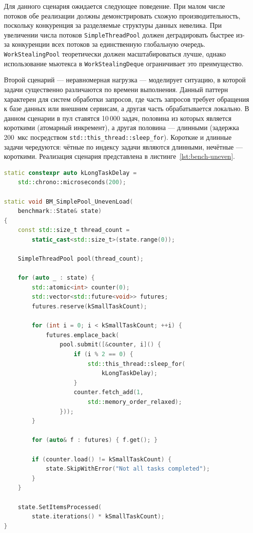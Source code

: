 Для данного сценария ожидается следующее поведение. При малом
числе потоков обе реализации должны демонстрировать схожую
производительность, поскольку конкуренция за разделяемые
структуры данных невелика. При увеличении числа потоков
\texttt{SimpleThreadPool} должен деградировать быстрее из-за
конкуренции всех потоков за единственную глобальную очередь.
\texttt{WorkStealingPool} теоретически должен масштабироваться
лучше, однако использование мьютекса в \texttt{WorkStealingDeque}
ограничивает это преимущество.

Второй сценарий --- неравномерная нагрузка --- моделирует
ситуацию, в которой задачи существенно различаются по времени
выполнения. Данный паттерн характерен для систем обработки
запросов, где часть запросов требует обращения к базе данных
или внешним сервисам, а другая часть обрабатывается локально.
В данном сценарии в пул ставятся 10\,000 задач, половина из
которых является короткими (атомарный инкремент), а другая
половина --- длинными (задержка 200~мкс посредством
\texttt{std::this\_thread::sleep\_for}). Короткие и длинные
задачи чередуются: чётные по индексу задачи являются длинными,
нечётные --- короткими. Реализация сценария представлена
в листинге~\ref{lst:bench-uneven}.

\begin{lstlisting}[language=C++,
                   caption={Сценарий 2: неравномерная нагрузка},
                   label={lst:bench-uneven}]
static constexpr auto kLongTaskDelay =
    std::chrono::microseconds(200);

static void BM_SimplePool_UnevenLoad(
    benchmark::State& state)
{
    const std::size_t thread_count =
        static_cast<std::size_t>(state.range(0));

    SimpleThreadPool pool(thread_count);

    for (auto _ : state) {
        std::atomic<int> counter(0);
        std::vector<std::future<void>> futures;
        futures.reserve(kSmallTaskCount);

        for (int i = 0; i < kSmallTaskCount; ++i) {
            futures.emplace_back(
                pool.submit([&counter, i]() {
                    if (i % 2 == 0) {
                        std::this_thread::sleep_for(
                            kLongTaskDelay);
                    }
                    counter.fetch_add(1,
                        std::memory_order_relaxed);
                }));
        }

        for (auto& f : futures) { f.get(); }

        if (counter.load() != kSmallTaskCount) {
            state.SkipWithError("Not all tasks completed");
        }
    }

    state.SetItemsProcessed(
        state.iterations() * kSmallTaskCount);
}
\end{lstlisting}

